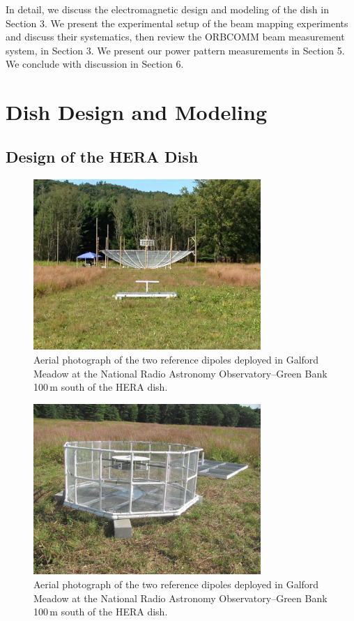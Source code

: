 \documentclass{emulateapj}
\begin{document}
In detail, we discuss the electromagnetic design and modeling of the dish in Section 3. We present the 
experimental setup of the beam mapping experiments and discuss their systematics, then 
review the ORBCOMM beam measurement system, in Section 3. We present our power pattern 
measurements in Section 5. We conclude with discussion in Section 6.

\section{Dish Design and Modeling}

\subsection{Design of the HERA Dish}

\begin{figure}[h]
\includegraphics[width=3.4in]{IMG_0353.JPG}
\caption{Aerial photograph of the two reference dipoles deployed in Galford Meadow at the National Radio Astronomy Observatory--Green Bank 100\,m south of the HERA dish.}
\label{fig:dishphoto}
\end{figure}


\begin{figure}[h]
\includegraphics[width=3.4in]{feed.jpg}
\caption{Aerial photograph of the two reference dipoles deployed in Galford Meadow at the National Radio Astronomy Observatory--Green Bank 100\,m south of the HERA dish.}
\label{fig:dishphoto}
\end{figure}
\end{document}
